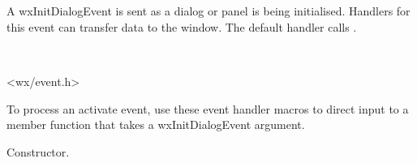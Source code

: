 \section{}\label{wxinitdialogevent}

A wxInitDialogEvent is sent as a dialog or panel is being initialised.
Handlers for this event can transfer data to the window.
The default handler calls .


\\


<wx/event.h>


To process an activate event, use these event handler macros to direct input to a member
function that takes a wxInitDialogEvent argument.

\twocolwidtha{7cm}
\begin{twocollist}\itemsep=0pt
\end{twocollist}%






Constructor.


